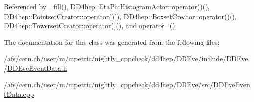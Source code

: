 Referenced by \+\_\+fill(), D\+D4hep\+::\+Eta\+Phi\+Histogram\+Actor\+::operator()(), D\+D4hep\+::\+Pointset\+Creator\+::operator()(), D\+D4hep\+::\+Boxset\+Creator\+::operator()(), D\+D4hep\+::\+Towerset\+Creator\+::operator()(), and operator=().



The documentation for this class was generated from the following files\+:\begin{DoxyCompactItemize}
\item 
/afs/cern.\+ch/user/m/mpetric/nightly\+\_\+cppcheck/dd4hep/\+D\+D\+Eve/include/\+D\+D\+Eve/\hyperlink{_d_d_eve_event_data_8h}{D\+D\+Eve\+Event\+Data.\+h}\item 
/afs/cern.\+ch/user/m/mpetric/nightly\+\_\+cppcheck/dd4hep/\+D\+D\+Eve/src/\hyperlink{_d_d_eve_event_data_8cpp}{D\+D\+Eve\+Event\+Data.\+cpp}\end{DoxyCompactItemize}
